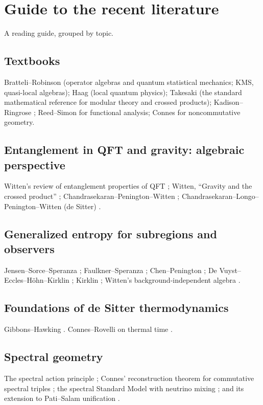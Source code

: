 \section{Guide to the recent literature}\label{ch:literature}

\begin{physmotiv}
A reading guide, grouped by topic.
\end{physmotiv}

\subsection{Textbooks}
Bratteli--Robinson \cite{BratteliRobinson1,BratteliRobinson2} (operator algebras and quantum statistical mechanics; KMS, quasi-local algebras); Haag \cite{Haag} (local quantum physics); Takesaki \cite{Takesaki1,Takesaki2} (the standard mathematical reference for modular theory and crossed products); Kadison--Ringrose \cite{KadisonRingrose1}; Reed--Simon \cite{ReedSimon1} for functional analysis; Connes \cite{Connes1994} for noncommutative geometry.

\subsection{Entanglement in QFT and gravity: algebraic perspective}
Witten's review of entanglement properties of QFT \cite{Witten2018}; Witten, ``Gravity and the crossed product'' \cite{Witten2021}; Chandrasekaran--Penington--Witten \cite{CPW2022}; Chandrasekaran--Longo--Penington--Witten (de Sitter) \cite{CLPW2023}.

\subsection{Generalized entropy for subregions and observers}
Jensen--Sorce--Speranza \cite{JSS2023}; Faulkner--Speranza \cite{FaulknerSperanza2024}; Chen--Penington \cite{ChenPenington2024}; De Vuyst--Eccles--H\"ohn--Kirklin \cite{DEHK2024a,DEHK2024b}; Kirklin \cite{Kirklin2024GSL}; Witten's background-independent algebra \cite{Witten2023bg}.

\subsection{Foundations of de Sitter thermodynamics}
Gibbons--Hawking \cite{GibbonsHawking1977}. Connes--Rovelli on thermal time \cite{ConnesRovelli1994}.

\subsection{Spectral geometry}
The spectral action principle \cite{CCM1997}; Connes' reconstruction theorem for commutative spectral triples \cite{Connes2013}; the spectral Standard Model with neutrino mixing \cite{CCM2007}; and its extension to Pati--Salam unification \cite{CCvS2013}.

